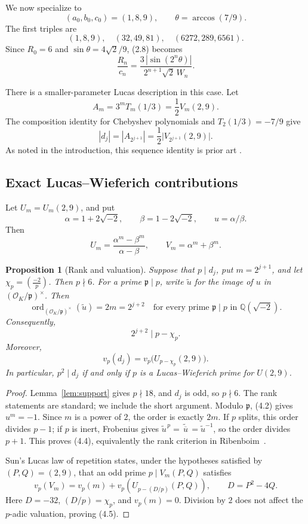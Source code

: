 \documentclass[11pt]{article}
\newtheorem{proposition}[theorem]{Proposition}
\theoremstyle{remark}
\newcommand{\ord}{\operatorname{ord}}
\newcommand{\QQ}{\mathbb{Q}}
\newcommand{\OK}{\mathcal{O}_K}
\begin{document}
We now specialize to
\[
 (a_0,b_0,c_0)=(1,8,9),\qquad
 \theta=\arccos(7/9).
\]
The first triples are
\[
 (1,8,9),\quad(32,49,81),\quad(6272,289,6561).
\]
Since \(R_0=6\) and \(\sin\theta=4\sqrt2/9\), (2.8) becomes
\[
 \boxed{\quad
 \frac{R_n}{c_n}
 =\frac{3\,|\sin(2^n\theta)|}
        {2^{n+1}\sqrt2\,W_n}.
 \quad}                                                    \tag{4.1}
\]

There is a smaller-parameter Lucas description in this case.  Let
\[
 A_m=3^mT_m(1/3)=\frac12V_m(2,9).
\]
The composition identity for Chebyshev polynomials and
\(T_2(1/3)=-7/9\) give
\[
 |d_j|=|A_{2^{j+1}}|
      =\frac12\bigl|V_{2^{j+1}}(2,9)\bigr|.                \tag{4.2}
\]
As noted in the introduction, this sequence identity is prior art
\cite{OEIS-A025172}.

\subsection{Exact Lucas--Wieferich contributions}

Let \(U_m=U_m(2,9)\), and put
\[
 \alpha=1+2\sqrt{-2},\qquad
 \beta=1-2\sqrt{-2},\qquad u=\alpha/\beta.
\]
Then
\[
 U_m=\frac{\alpha^m-\beta^m}{\alpha-\beta},\qquad
 V_m=\alpha^m+\beta^m.
\]

\begin{proposition}[Rank and valuation]\label{prop:valuation}
Suppose that \(p\mid d_j\), put \(m=2^{j+1}\), and let
\(\chi_p=\left(\frac{-2}{p}\right)\).  Then \(p\nmid6\).  For a prime
\(\mathfrak p\mid p\), write \(\widetilde u\) for the image of \(u\) in
\((\OK/\mathfrak p)^\times\).  Then
\[
 \ord_{(\OK/\mathfrak p)^\times}(\widetilde u)=2m=2^{j+2}
 \quad\text{for every prime }\mathfrak p\mid p
 \text{ in }\QQ(\sqrt{-2}).                               \tag{4.3}
\]
Consequently,
\[
 2^{j+2}\mid p-\chi_p.                                    \tag{4.4}
\]
Moreover,
\[
 v_p(d_j)=v_p\bigl(U_{p-\chi_p}(2,9)\bigr).                \tag{4.5}
\]
In particular, \(p^2\mid d_j\) if and only if \(p\) is a
Lucas--Wieferich prime for \(U(2,9)\).
\end{proposition}

\begin{proof}
Lemma~\ref{lem:support} gives \(p\nmid18\), and \(d_j\) is odd, so
\(p\nmid6\).  The rank statements are standard; we include the short
argument.
Modulo \(\mathfrak p\), (4.2) gives \(u^m=-1\).  Since \(m\) is a power
of \(2\), the order is exactly \(2m\).  If \(p\) splits, this order
divides \(p-1\); if \(p\) is inert, Frobenius gives
\(\widetilde u^{\,p}=\widetilde{\,\overline u\,}
 =\widetilde u^{-1}\), so the order divides
\(p+1\).  This proves (4.4), equivalently the rank criterion in
Ribenboim~\cite[\S2.13]{Ribenboim2001}.

Sun's Lucas law of repetition
\cite[Theorem~3(ii)]{Sun2013} states, under the hypotheses satisfied by
\((P,Q)=(2,9)\), that an odd prime \(p\mid V_m(P,Q)\) satisfies
\[
 v_p(V_m)=v_p(m)+v_p\left(U_{p-(D/p)}(P,Q)\right),
 \qquad D=P^2-4Q.
\]
Here \(D=-32\), \((D/p)=\chi_p\), and \(v_p(m)=0\).  Division by \(2\)
does not affect the \(p\)-adic valuation, proving (4.5).
\end{proof}
\end{document}
